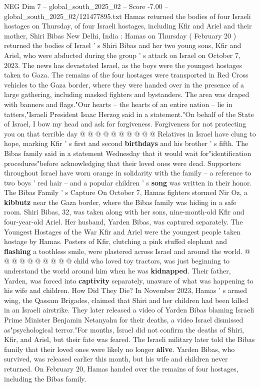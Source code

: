 \begin{textsample}{NEG Dim 7 – global\_south\_2025\_02 – Score -7.00 – global\_south\_2025\_02/121477895.txt}  \label{ex:f7_neg_270}
Hamas returned the bodies of four Israeli hostages on Thursday, of four Israeli hostages, including Kfir and Ariel and their mother, Shiri Bibas New Delhi, India : Hamas on Thursday ( February 20 ) returned the bodies of Israel ' s Shiri Bibas and her two young sons, Kfir and Ariel, who were abducted during the group ' s attack on Israel on October 7, 2023.
The news has devastated Israel, as the boys were the youngest hostages taken to Gaza.
The remains of the four hostages were transported in Red Cross vehicles to the Gaza border, where they were handed over in the presence of a large gathering, including masked fighters and bystanders.
The area was draped with banners and flags."Our hearts -- the hearts of an entire nation -- lie in tatters,"Israeli President Isaac Herzog said in a statement."On behalf of the State of Israel, I bow my head and ask for forgiveness.
Forgiveness for not protecting you on that terrible day @ @ @ @ @ @ @ @ @ @ Relatives in Israel have clung to hope, marking Kfir ' s first and second \textbf{birthdays} and his brother ' s fifth.
The Bibas family said in a statement Wednesday that it would wait for"identification procedures"before acknowledging that their loved ones were dead.
Supporters throughout Israel have worn orange in solidarity with the family -- a reference to two boys ' red hair -- and a popular children ' s \textbf{song} was written in their honor.
The Bibas Family ' s Capture On October 7, Hamas fighters stormed Nir Oz, a \textbf{kibbutz} near the Gaza border, where the Bibas family was hiding in a safe room.
Shiri Bibas, 32, was taken along with her sons, nine-month-old Kfir and four-year-old Ariel.
Her husband, Yarden Bibas, was captured separately.
The Youngest Hostages of the War Kfir and Ariel were the youngest people taken hostage by Hamas.
Posters of Kfir, clutching a pink stuffed elephant and \textbf{flashing} a toothless smile, were plastered across Israel and around the world. @ @ @ @ @ @ @ @ @ @ child who loved toy tractors, was just beginning to understand the world around him when he was \textbf{kidnapped}.
Their father, Yarden, was forced into \textbf{captivity} separately, unaware of what was happening to his wife and children.
How Did They Die?
In November 2023, Hamas ' s armed wing, the Qassam Brigades, claimed that Shiri and her children had been killed in an Israeli airstrike.
They later released a video of Yarden Bibas blaming Israeli Prime Minister Benjamin Netanyahu for their deaths, a video Israel dismissed as"psychological terror."For months, Israel did not confirm the deaths of Shiri, Kfir, and Ariel, but their fate was feared.
The Israeli military later told the Bibas family that their loved ones were likely no longer \textbf{alive}.
Yarden Bibas, who survived, was released earlier this month, but his wife and children never returned.
On February 20, Hamas handed over the remains of four hostages, including the Bibas family.

\end{textsample}
